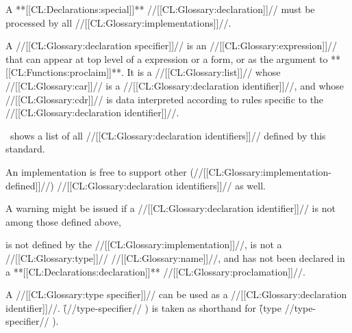 A **[[CL:Declarations:special]]** //[[CL:Glossary:declaration]]// must be processed by all //[[CL:Glossary:implementations]]//.

\endSubsection%


A //[[CL:Glossary:declaration specifier]]// is an //[[CL:Glossary:expression]]// that can appear at top level of a  expression or a  form, or as  the argument to **[[CL:Functions:proclaim]]**. It is a //[[CL:Glossary:list]]// whose //[[CL:Glossary:car]]// is a //[[CL:Glossary:declaration identifier]]//, and whose //[[CL:Glossary:cdr]]// is data interpreted according to rules specific to the //[[CL:Glossary:declaration identifier]]//.

\endSubsection%


\Thenextfigure\ shows a list of all  //[[CL:Glossary:declaration identifiers]]//  defined by this standard.

 

An implementation is free to support other (//[[CL:Glossary:implementation-defined]]//) //[[CL:Glossary:declaration identifiers]]// as well.  

A warning might be issued if a //[[CL:Glossary:declaration identifier]]//  is not among those defined above,

is not defined by the //[[CL:Glossary:implementation]]//, is not a //[[CL:Glossary:type]]// //[[CL:Glossary:name]]//,  and has not been declared in a **[[CL:Declarations:declaration]]** //[[CL:Glossary:proclamation]]//.


A //[[CL:Glossary:type specifier]]// can be used as a //[[CL:Glossary:declaration identifier]]//. \f{(//type-specifier// )} is taken as shorthand for \f{(type //type-specifier// )}.

\endsubsubsection%

\endSubsection%

